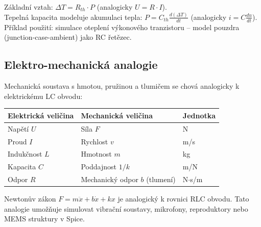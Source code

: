 Základní vztah: $\Delta T = R_{th} \cdot P$ (analogicky $U = R \cdot I$).\\
Tepelná kapacita modeluje akumulaci tepla: $P = C_{th} \frac{d(\Delta T)}{dt}$ (analogicky $i = C \frac{du}{dt}$).\\
Příklad použití: simulace oteplení výkonového tranzistoru -- model pouzdra (junction-case-ambient) jako RC řetězec.

\subsection{Elektro-mechanická analogie}
Mechanická soustava s hmotou, pružinou a tlumičem se chová analogicky k elektrickému LC obvodu:

\begin{center}
\begin{tabular}{lll}
\toprule
\textbf{Elektrická veličina} & \textbf{Mechanická veličina} & \textbf{Jednotka} \\
\midrule
Napětí $U$ & Síla $F$ & N \\
Proud $I$ & Rychlost $v$ & m/s \\
Indukčnost $L$ & Hmotnost $m$ & kg \\
Kapacita $C$ & Poddajnost $1/k$ & m/N \\
Odpor $R$ & Mechanický odpor $b$ (tlumení) & N$\cdot$s/m \\
\bottomrule
\end{tabular}
\end{center}

Newtonův zákon $F = m\ddot{x} + b\dot{x} + kx$ je analogický k rovnici RLC obvodu. Tato analogie umožňuje simulovat vibrační soustavy, mikrofony, reproduktory nebo MEMS struktury v Spice.
